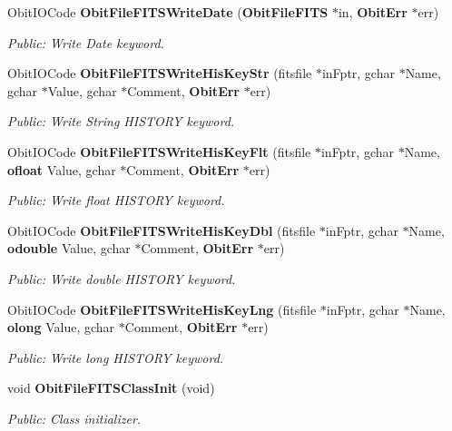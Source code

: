 \begin{CompactItemize}
Obit\-IOCode {\bf Obit\-File\-FITSWrite\-Date} ({\bf Obit\-File\-FITS} $\ast$in, {\bf Obit\-Err} $\ast$err)
\begin{CompactList}\small\item\em Public: Write Date keyword. \item\end{CompactList}\item 
Obit\-IOCode {\bf Obit\-File\-FITSWrite\-His\-Key\-Str} (fitsfile $\ast$in\-Fptr, gchar $\ast$Name, gchar $\ast$Value, gchar $\ast$Comment, {\bf Obit\-Err} $\ast$err)
\begin{CompactList}\small\item\em Public: Write String HISTORY keyword. \item\end{CompactList}\item 
Obit\-IOCode {\bf Obit\-File\-FITSWrite\-His\-Key\-Flt} (fitsfile $\ast$in\-Fptr, gchar $\ast$Name, {\bf ofloat} Value, gchar $\ast$Comment, {\bf Obit\-Err} $\ast$err)
\begin{CompactList}\small\item\em Public: Write float HISTORY keyword. \item\end{CompactList}\item 
Obit\-IOCode {\bf Obit\-File\-FITSWrite\-His\-Key\-Dbl} (fitsfile $\ast$in\-Fptr, gchar $\ast$Name, {\bf odouble} Value, gchar $\ast$Comment, {\bf Obit\-Err} $\ast$err)
\begin{CompactList}\small\item\em Public: Write double HISTORY keyword. \item\end{CompactList}\item 
Obit\-IOCode {\bf Obit\-File\-FITSWrite\-His\-Key\-Lng} (fitsfile $\ast$in\-Fptr, gchar $\ast$Name, {\bf olong} Value, gchar $\ast$Comment, {\bf Obit\-Err} $\ast$err)
\begin{CompactList}\small\item\em Public: Write long HISTORY keyword. \item\end{CompactList}\item 
void {\bf Obit\-File\-FITSClass\-Init} (void)
\begin{CompactList}\small\item\em Public: Class initializer. \item\end{CompactList}\end{CompactItemize}


